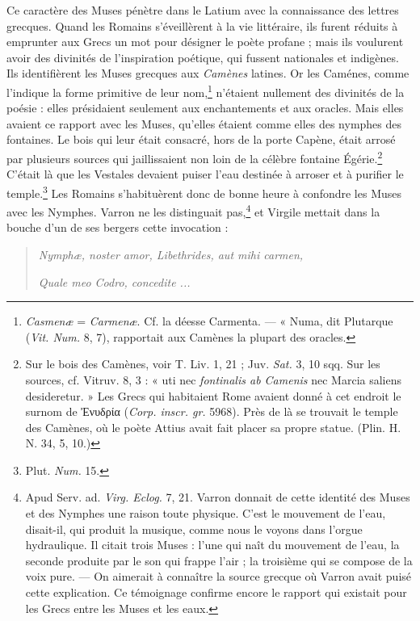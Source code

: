 \documentclass[a4paper, 11pt, oneside, polutonikogreek, french]{article}
\begin{document}
Ce caractère des Muses pénètre dans le Latium avec la connaissance des lettres grecques. Quand les Romains s'éveillèrent à la vie littéraire, ils furent réduits à emprunter aux Grecs un mot pour désigner le poète profane ; mais ils voulurent avoir des divinités de l'inspiration poétique, qui fussent nationales et indigènes. Ils identifièrent les Muses grecques aux \emph{Camènes} latines. Or les Caménes, comme l'indique la forme primitive de leur nom,\footnote{\emph{Casmenæ} = \emph{Carmenæ}. Cf. la déesse Carmenta. --- « Numa, dit Plutarque (\emph{Vit. Num.} 8, 7), rapportait aux Camènes la plupart des oracles.} n'étaient nullement des divinités de la poésie : elles présidaient seulement aux enchantements et aux oracles. Mais elles avaient ce rapport avec les Muses, qu'elles étaient comme elles des nymphes des fontaines. Le bois qui leur était consacré, hors de la porte Capène, était arrosé par plusieurs sources qui jaillissaient non loin de la célèbre fontaine Égérie.\footnote{Sur le bois des Camènes, voir T. Liv. 1, 21 ; Juv. \emph{Sat.} 3, 10 sqq. Sur les sources, cf. Vitruv. 8, 3 : « uti nec \emph{fontinalis ab Camenis} nec Marcia saliens desideretur. » Les Grecs qui habitaient Rome avaient donné à cet endroit le surnom de Ἐνυδρία (\emph{Corp. inscr. gr.} 5968). Près de là se trouvait le temple des Camènes, où le poète Attius avait fait placer sa propre statue. (Plin. H. N. 34, 5, 10.)} C'était là que les Vestales devaient puiser l'eau destinée à arroser et à purifier le temple.\footnote{Plut. \emph{Num.} 15.} Les Romains s'habituèrent donc de bonne heure à confondre les Muses avec les Nymphes. Varron ne les distinguait pas,\footnote{Apud Serv. ad. \emph{Virg. Eclog.} 7, 21. Varron donnait de cette identité des Muses et des Nymphes une raison toute physique. C'est le mouvement de l'eau, disait-il, qui produit la musique, comme nous le voyons dans l'orgue hydraulique. Il citait trois Muses : l'une qui naît du mouvement de l'eau, la seconde produite par le son qui frappe l'air ; la troisième qui se compose de la voix pure. --- On aimerait à connaître la source grecque où Varron avait puisé cette explication. Ce témoignage confirme encore le rapport qui existait pour les Grecs entre les Muses et les eaux.} et Virgile mettait dans la bouche d'un de ses bergers cette invocation :
\begin{quotation}
\emph{Nymphæ, noster amor, Libethrides, aut mihi carmen,}

\emph{Quale meo Codro, concedite ...}
\end{quotation}
\end{document}
